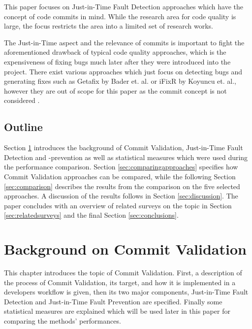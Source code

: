This paper focuses on Just-in-Time Fault Detection approaches which have the concept of code commits in mind. 
While the research area for code quality is large, the focus restricts the area into a limited set of research works.

The Just-in-Time aspect and the relevance of commits is important to fight the aforementioned drawback of typical code quality approaches, which is the expensiveness of fixing bugs much later after they were introduced into the project. 
There exist various approaches which just focus on detecting bugs and generating fixes such as Getafix by Bader et. al. or iFixR by Koyuncu et. al., however they are out of scope for this paper as the commit concept is not considered \cite{Bader2019,Koyuncu2019}.


\subsection{Outline}
Section \ref{sec:background} introduces the background of Commit Validation, Just-in-Time Fault Detection and -prevention as well as statistical measures which were used during the performance comparison.
Section \ref{sec:comparingapproaches} specifies how Commit Validation approaches can be compared, while the following Section \ref{sec:comparison} describes the results from the comparison on the five selected approaches. A discussion of the results follows in Section \ref{sec:discussion}.
The paper concludes with an overview of related surveys on the topic in Section \ref{sec:relatedsurveys} and the final Section \ref{sec:conclusions}.



\section{Background on Commit Validation}
\label{sec:background}

This chapter introduces the topic of Commit Validation. 
First, a description of the process of Commit Validation, its target, and how it is implemented in a developers workflow is given, 
then its two major components, Just-in-Time Fault Detection and Just-in-Time Fault Prevention are specified. Finally some statistical measures are explained which will be used later in this paper for comparing the methods' performances.


